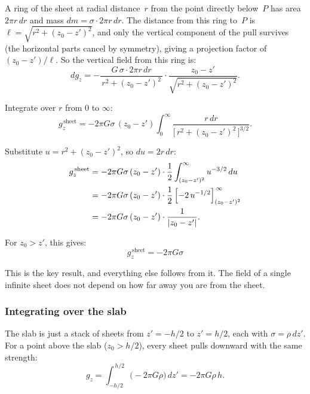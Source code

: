 \documentclass[11pt, letterpaper]{article}
\begin{document}
A ring of the sheet at radial distance~$r$ from the point directly below~$P$ has area $2\pi r \, dr$ and mass $dm = \sigma \cdot 2\pi r \, dr$. The distance from this ring to~$P$ is $\ell = \sqrt{r^2 + (z_0 - z')^2}$, and only the vertical component of the pull survives (the horizontal parts cancel by symmetry), giving a projection factor of $(z_0 - z')/\ell$. So the vertical field from this ring is:
\begin{equation}
  dg_z = -\frac{G \, \sigma \cdot 2\pi r \, dr}{\,r^2 + (z_0 - z')^2\,} \cdot \frac{z_0 - z'}{\sqrt{r^2 + (z_0 - z')^2}}.
\end{equation}

Integrate over $r$ from $0$ to $\infty$:
\begin{equation}
  g_z^{\,\text{sheet}} = -2\pi G \sigma \, (z_0 - z') \int_0^\infty \frac{r \, dr}{\bigl[\,r^2 + (z_0 - z')^2\,\bigr]^{3/2}}.
\end{equation}

Substitute $u = r^2 + (z_0 - z')^2$, so $du = 2r\,dr$:
\begin{align}
  g_z^{\,\text{sheet}} &= -2\pi G \sigma \, (z_0 - z') \cdot \frac{1}{2} \int_{(z_0 - z')^2}^{\infty} u^{-3/2}\,du \notag \\
  &= -2\pi G \sigma \, (z_0 - z') \cdot \frac{1}{2} \left[-2\,u^{-1/2}\right]_{(z_0-z')^2}^{\,\infty} \notag \\
  &= -2\pi G \sigma \, (z_0 - z') \cdot \frac{1}{|z_0 - z'|}.
\end{align}

For $z_0 > z'$, this gives:
\begin{equation}
  \boxed{\;g_z^{\,\text{sheet}} = -2\pi G \sigma\;}
  \label{eq:sheet}
\end{equation}

This is the key result, and everything else follows from it. The field of a single infinite sheet does not depend on how far away you are from the sheet.

\subsubsection{Integrating over the slab}

The slab is just a stack of sheets from $z' = -h/2$ to $z' = h/2$, each with $\sigma = \rho \, dz'$. For a point above the slab ($z_0 > h/2$), every sheet pulls downward with the same strength:
\begin{equation}
  g_z = \int_{-h/2}^{\,h/2} \!\bigl(-2\pi G \rho\bigr)\,dz' = -2\pi G \rho \, h.
\end{equation}
\end{document}
